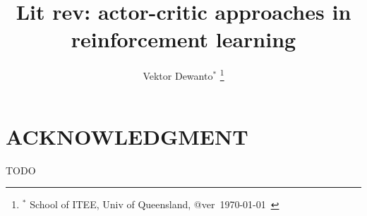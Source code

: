 \documentclass[letterpaper, 10 pt, conference]{ieeeconf}  %
\title{\LARGE \bf
Lit rev: actor-critic approaches in reinforcement learning
}
\author{Vektor Dewanto$^{*}$
\thanks{$^{*}$ School of ITEE, Univ of Queensland, @ver~\today~\currenttime}%
}
\begin{document}
\maketitle
\thispagestyle{empty}
\pagestyle{plain}






\addtolength{\textheight}{-12cm}   %


\section*{ACKNOWLEDGMENT}
TODO



\end{document}
